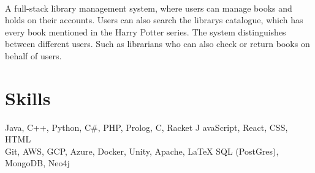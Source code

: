 \documentclass[]{resume-openfont}
\begin{document}
\\
A full-stack library management system, where users can manage books and holds on their accounts. Users can also search the library\textquotesingle{}s catalogue, which has every book mentioned in the Harry Potter series. The system distinguishes between different users. Such as librarians who can also check or return books on behalf of users.\\
\sectionsep
%
%
\section{Skills}

\begin{resumeSkillList}
    \small{\item{
     Java, C++, Python, C\#, PHP, Prolog, C, Racket
    \hspace*{\fill} 
    J avaScript, React, CSS, HTML
    \\
     Git, AWS, GCP, Azure, Docker, Unity, Apache, \LaTeX
    \hspace*{\fill} 
     SQL (PostGres), MongoDB, Neo4j
    }}
\end{resumeSkillList}
\end{document}
